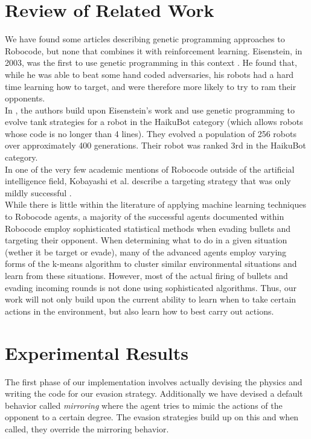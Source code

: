 \documentclass{article}
\theoremstyle{plain}
\theoremstyle{definition}
\theoremstyle{remark}
\begin{document}
\section{Review of Related Work}
We have found some articles describing genetic programming approaches to Robocode, but none that combines it with reinforcement learning. Eisenstein, in 2003, was the first to use genetic programming in this context \cite{gp2}. He found that, while he was able to beat some hand coded adversaries, his robots had a hard time learning how to target, and were therefore more likely to try to ram their opponents.\\

In \cite{gp1}, the authors build upon Eisenstein's work and use genetic programming to evolve tank strategies for a robot in the HaikuBot category (which allows robots whose code is no longer than 4 lines). They evolved a population of 256 robots over approximately 400 generations. Their robot was ranked 3rd in the HaikuBot category.\\

In one of the very few academic mentions of Robocode outside of the artificial intelligence field, Kobayashi et al. describe a targeting strategy that was only mildly successful \cite{strategies}. \\

While there is little within the literature of applying machine learning techniques to Robocode agents, a majority of the successful agents documented within Robocode employ sophisticated statistical methods when evading bullets and targeting their opponent. When determining what to do in a given situation (wether it be target or evade), many of the advanced agents employ varying forms of the k-means algorithm to cluster similar environmental situations and learn from these situations. However, most of the actual firing of bullets and evading incoming rounds is not done using sophisticated algorithms. Thus, our work will not only build upon the current ability to learn when to take certain actions in the environment, but also learn how to best carry out actions. 

\section{Experimental Results}
The first phase of our implementation involves actually devising the physics and writing the code for our evasion strategy. Additionally we have devised a default behavior called \emph{mirroring} where the agent tries to mimic the actions of the opponent to a certain degree. The evasion strategies build up on this and when called, they override the mirroring behavior. 
\end{document}
